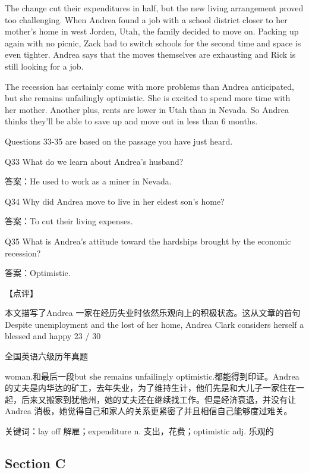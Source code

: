 \documentclass[UTF8,11pt]{ctexart}
\begin{document}
The change cut their expenditures in half, but the new living arrangement proved too challenging. When Andrea found a job with a school district closer to her mother’s home in west Jorden, Utah, the family decided to move on. Packing up again with no picnic, Zack had to switch schools for the second time and space is even tighter. Andrea says that the moves themselves are exhausting and Rick is still looking for a job.


The recession has certainly come with more problems than Andrea anticipated, but she remains unfailingly optimistic. She is excited to spend more time with her mother. Another plus, rents are lower in Utah than in Nevada. So Andrea thinks they’ll be able to save up and move out in less than 6 months.


Questions 33-35 are based on the passage you have just heard.


Q33 What do we learn about Andrea’s husband?


答案：He used to work as a miner in Nevada.


Q34 Why did Andrea move to live in her eldest son’s home?


答案：To cut their living expenses.


Q35 What is Andrea’s attitude toward the hardships brought by the economic recession?


答案：Optimistic.


【点评】


本文描写了Andrea 一家在经历失业时依然乐观向上的积极状态。这从文章的首句Despite unemployment and the lost of her home, Andrea Clark considers herself a blessed and happy 23 / 30


全国英语六级历年真题


woman.和最后一段but she remains unfailingly optimistic.都能得到印证。Andrea 的丈夫是内华达的矿工，去年失业，为了维持生计，他们先是和大儿子一家住在一起，后来又搬家到犹他州，她的丈夫还在继续找工作。但是经济衰退，并没有让Andrea 消极，她觉得自己和家人的关系更紧密了并且相信自己能够度过难关。


关键词：lay off 解雇；expenditure n. 支出，花费；optimistic adj. 乐观的


\subsection*{Section C}
\end{document}
